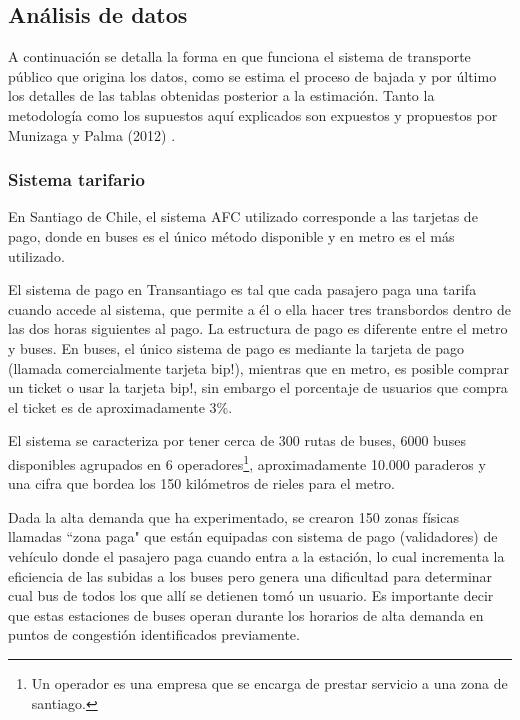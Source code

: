 \documentclass[12pt]{article}
\begin{document}
    
    \newpage
    \subsection{Análisis de datos}\label{sec:Analisis_datos}

	A continuación se detalla la forma en que funciona el sistema de transporte público que origina los datos, como se estima el proceso de bajada y por último los detalles de las tablas obtenidas posterior a la estimación. Tanto la metodología como los supuestos aquí explicados son expuestos y propuestos por Munizaga y Palma (2012) \cite{Procesamiento_datos}.
	
	\subsubsection{Sistema tarifario}
En Santiago de Chile, el sistema AFC utilizado corresponde a las tarjetas de pago, donde en buses es el único método disponible y en metro es el más utilizado.

El sistema de pago en Transantiago es tal que cada pasajero paga una tarifa cuando accede al sistema, que permite a él o ella hacer tres transbordos dentro de las dos horas siguientes al pago. La estructura de pago es diferente entre el metro y buses. En buses, el único sistema de pago es mediante la tarjeta de pago (llamada comercialmente tarjeta bip!), mientras que en metro, es posible comprar un ticket o usar la tarjeta bip!, sin embargo el porcentaje de usuarios que compra el ticket es de aproximadamente 3\%.


El sistema se caracteriza por tener cerca de 300 rutas de buses, 6000 buses disponibles agrupados en 6 operadores\footnote{Un operador es una empresa que se encarga de prestar servicio a una zona de santiago.}, aproximadamente 10.000 paraderos y una cifra que bordea los 150 kilómetros de rieles para el metro. 

Dada la alta demanda que ha experimentado, se crearon 150 zonas físicas llamadas ``zona paga" que están equipadas con sistema de pago (validadores) de vehículo donde el pasajero paga cuando entra a la estación, lo cual incrementa la eficiencia de las subidas a los buses pero genera una dificultad para determinar cual bus de todos los que allí se detienen tomó un usuario. Es importante decir que estas estaciones de buses operan durante los horarios de alta demanda en puntos de congestión identificados previamente.
\end{document}

